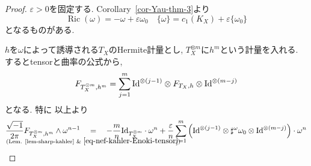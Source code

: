 \documentclass[dvipdfmx,a4paper,11pt]{article} %
\theoremstyle{definition}
\theoremstyle{remark}
\numberwithin{equation}{section}
\newcommand{\Id}{{\rm Id}}
\DeclareMathOperator{\Ric}{Ric}
\newcommand{\underalign}[2]{%
  \quad
  \underset{\mathclap{\raisebox{-1.6ex}{\ensuremath{\scriptstyle #1}}}}{#2}
  \quad
}
\begin{document}
 \begin{proof}
 $\varepsilon>0$を固定する.
Corollary~\ref{cor-Yau-thm-3}より
 \begin{equation}
\label{eq-nef-kahler-Enoki-tensor}
\Ric(\omega) = -\omega + \varepsilon \omega_0
 \quad 
\{\omega \} = c_1(K_X) + \varepsilon\{\omega_0\}
 \end{equation}
 となるものがある. 
 
 $h$を$\omega$によって誘導される$T_X$のHermite計量とし, 
 $T_X^{\otimes m}$に$h^{m}$という計量を入れる. 
 するとtensorと曲率の公式から, 
 \[
F_{T_X^{\otimes m},h^m}
=
\sum_{j=1}^m
\Id^{\otimes(j-1)}
\otimes
F_{T_X,h}
\otimes
\Id^{\otimes(m-j)}
 \]
 となる. 特に
 以上より
 \begin{equation}
\label{eq-multi-tensor}
  \frac{\sqrt{-1}}{2\pi} 
  F_{T_X^{\otimes m},h^m} \wedge \omega^{n-1}
  \underalign{\text{(Lem. \ref{lem-sharp-kahler} \& }\eqref{eq-nef-kahler-Enoki-tensor})}{=}
 -\frac{m}{n}\Id_{T_X^{\otimes m}}
 \cdot \omega^{n}
+
\frac{\varepsilon }{n}
\sum_{j=1}^m
\left(
\Id^{\otimes(j-1)}
\otimes \sharp^\omega\omega_0
\otimes
\Id^{\otimes(m-j)} 
\right)
 \cdot \omega^{n}
 \end{equation}


\end{proof}
\end{document}
